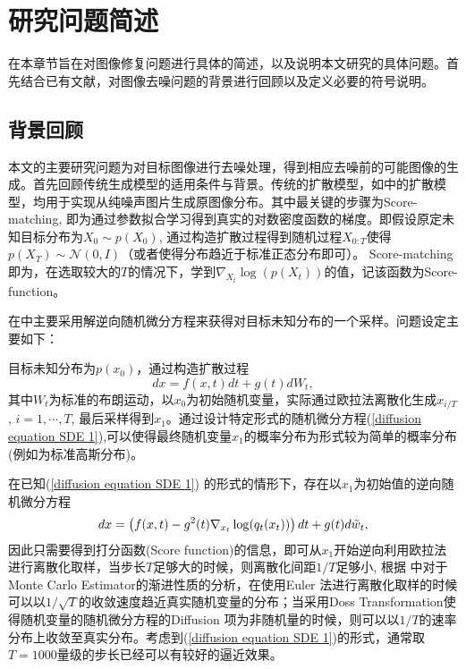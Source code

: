 \chapter{研究问题简述}
在本章节旨在对图像修复问题进行具体的简述，以及说明本文研究的具体问题。首先结合已有文献，对图像去噪问题的背景进行回顾以及定义必要的符号说明。
\section{背景回顾}
本文的主要研究问题为对目标图像进行去噪处理，得到相应去噪前的可能图像的生成。首先回顾传统生成模型的适用条件与背景。传统的扩散模型，如\cite{song_2,DDPM,DDIM}中的扩散模型，均用于实现从纯噪声图片生成原图像分布。其中最关键的步骤为Score-matching, 即为通过参数拟合学习得到真实的对数密度函数的梯度。即假设原定未知目标分布为$X_0\sim p(X_0)$, 通过构造扩散过程得到随机过程$X_{0:T}$使得$p(X_{T})\sim \mathcal{N}(0,I)$（或者使得分布趋近于标准正态分布即可）。 Score-matching即为，在选取较大的$T$的情况下，学到$\nabla_{X_t}\log (p(X_t))$的值，记该函数为Score-function。     

在\cite{song_2}中主要采用解逆向随机微分方程来获得对目标未知分布的一个采样。问题设定主要如下：   

目标未知分布为$p(x_0)$，通过构造扩散过程
\begin{equation}
    dx = f(x,t)dt + g(t)dW_t,
    \label{diffusion equation SDE 1}
\end{equation}
其中$W_t$为标准的布朗运动，以$x_0$为初始随机变量，实际通过欧拉法离散化生成$x_{i/T}$, $i=1,\cdots, T$, 最后采样得到$x_1$。通过设计特定形式的随机微分方程(\ref{diffusion equation SDE 1}),可以使得最终随机变量$x_1$的概率分布为形式较为简单的概率分布 (例如为标准高斯分布)。   

在已知(\ref{diffusion equation SDE 1}) 的形式的情形下，存在以$x_1$为初始值的逆向随机微分方程
\begin{equation}
     dx = \left(f(x,t)-g^2(t)\nabla_{x_t}\log(q_t(x_t))\right)dt + g(t)d\Tilde{w}_t,
    \label{reverse diffusion equation SDE 1}
\end{equation}
因此只需要得到打分函数(Score function)的信息，即可从$x_1$开始逆向利用欧拉法进行离散化取样，当步长$T$足够大的时候，则离散化间距$1/T$足够小, 根据 
\cite{detemple}中对于Monte Carlo Estimator的渐进性质的分析，在使用Euler 法进行离散化取样的时候可以以$1/\sqrt{T}$的收敛速度趋近真实随机变量的分布；当采用Doss Transformation使得随机变量的随机微分方程的Diffusion 项为非随机量的时候，则可以以$1/T$的速率分布上收敛至真实分布。考虑到(\ref{diffusion equation SDE 1})的形式，通常取$T=1000$量级的步长已经可以有较好的逼近效果。      

